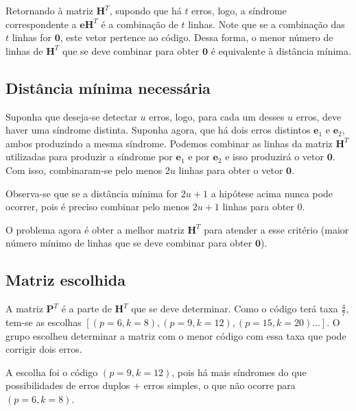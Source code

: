 Retornando à matriz $\textbf{H}^T$, supondo que há $t$ erros, logo, a síndrome correspondente a $\textbf{e}\textbf{H}^T$ é a combinação de $t$ linhas. Note que se a combinação das $t$ linhas for $\textbf{0}$, este vetor pertence ao código. Dessa forma, o menor número de linhas de $\textbf{H}^T$ que se deve combinar para obter $\textbf{0}$ é equivalente à distância mínima.

\subsection{Distância mínima necessária}

Suponha que deseja-se detectar $u$ erros, logo, para cada um desses $u$ erros, deve haver uma síndrome distinta. Suponha agora, que há dois erros distintos $\textbf{e}_1$ e $\textbf{e}_2$, ambos produzindo a mesma síndrome. Podemos combinar as linhas da matriz $\textbf{H}^T$ utilizadas para produzir a síndrome por $\textbf{e}_1$ e por $\textbf{e}_2$ e isso produzirá o vetor $\textbf{0}$. Com isso, combinaram-se pelo menos $2u$ linhas para obter o vetor $\textbf{0}$.

Observa-se que se a distância mínima for $2u+1$ a hipótese acima nunca pode ocorrer, pois é preciso combinar pelo menos $2u+1$ linhas para obter $0$.

O problema agora é obter a melhor matriz $\textbf{H}^T$ para atender a esse critério (maior número mínimo de linhas que se deve combinar para obter $\textbf{0}$).

\subsection{Matriz escolhida}

A matriz $\textbf{P}^T$ é a parte de $\textbf{H}^T$ que se deve determinar. Como o código terá taxa $\frac{4}{7}$, tem-se as escolhas $[(p=6, k=8), (p=9, k=12), (p=15, k=20)...]$. O grupo escolheu determinar a matriz com o menor código com essa taxa que pode corrigir dois erros.

A escolha foi o código $(p=9, k=12)$, pois há mais síndromes do que possibilidades de erros duplos + erros simples, o que não ocorre para $(p=6, k=8)$.